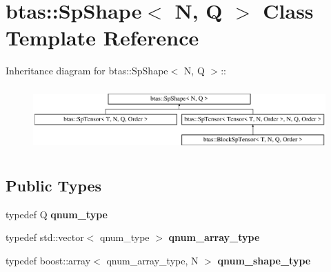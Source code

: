 \hypertarget{classbtas_1_1_sp_shape}{
\section{btas::SpShape$<$ N, Q $>$ Class Template Reference}
\label{classbtas_1_1_sp_shape}
}
Inheritance diagram for btas::SpShape$<$ N, Q $>$::\begin{figure}[H]
\begin{center}
\leavevmode
\includegraphics[height=2.48521cm]{classbtas_1_1_sp_shape}
\end{center}
\end{figure}
\subsection*{Public Types}
\begin{DoxyCompactItemize}
\item 
\hypertarget{classbtas_1_1_sp_shape_a20cda93438c4b52f3b2a6149ae450eea}{
typedef Q {\bfseries qnum\_\-type}}
\label{classbtas_1_1_sp_shape_a20cda93438c4b52f3b2a6149ae450eea}

\item 
\hypertarget{classbtas_1_1_sp_shape_a891abda1e58d0a753e15805d5b0fad98}{
typedef std::vector$<$ qnum\_\-type $>$ {\bfseries qnum\_\-array\_\-type}}
\label{classbtas_1_1_sp_shape_a891abda1e58d0a753e15805d5b0fad98}

\item 
\hypertarget{classbtas_1_1_sp_shape_a85dc2136fe37322ecfb09d0119895147}{
typedef boost::array$<$ qnum\_\-array\_\-type, N $>$ {\bfseries qnum\_\-shape\_\-type}}
\label{classbtas_1_1_sp_shape_a85dc2136fe37322ecfb09d0119895147}

\end{DoxyCompactItemize}
